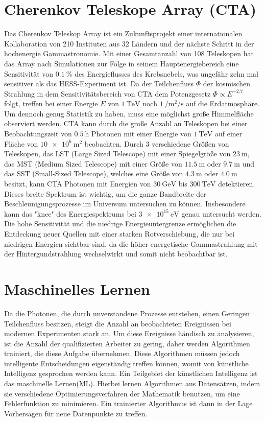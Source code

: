 \section{Cherenkov Teleskope Array (CTA)}

Das Cherenkov Teleskop Array ist ein Zukunftsprojekt einer internationalen Kollaboration von 210 Instituten aus 32 Ländern\cite{CTA_consortium}
und der nächste Schritt in der hochenergie Gammastronomie.
Mit einer Gesamtanzahl von 108 Teleskopen hat das Array nach Simulationen zur Folge in seinem Hauptenergiebereich eine Sensitivität von $\SI{0.1}{\percent}$
des Energieflusses des Krebsnebels, was ungefähr zehn mal sensitiver als das HESS-Experiment ist\cite{CTA_paper}.
Da der Teilchenfluss $\Phi$ der kosmischen Strahlung in dem Sensitivitätsbereich von CTA dem Potenzgesetz $\Phi \propto E^{-2.7}$\cite[5]{Cosmic_rays} folgt,
treffen bei einer Energie $E$ von $\SI{1}{\tera\eV}$ noch $\SI{1}{\per\m\squared\per\s}$ auf die Erdatmosphäre.
Um dennoch genug Statistik zu haben, muss eine möglichst große Himmelfläche observiert werden.
CTA kann durch die große Anzahl an Teleskopen bei einer Beobachtungszeit von $\SI{0.5}{\hour}$ Photonen mit einer Energie von $\SI{1}{\tera\eV}$ auf einer
Fläche von $\SI{10e6}{\m\squared}$\cite{CTA_ob} beobachten.
Durch 3 verschiedene Größen von Teleskopen, das LST (Large Sized Telescope) mit einer Spiegelgröße von $\SI{23}{\m}$, das MST (Medium Sized Telescope)
mit einer Größe von $\SI{11.5}{\m}$ oder $\SI{9.7}{\m}$ und das SST (Small-Sized Telescope), welches eine Größe von $\SI{4.3}{\m}$ oder $\SI{4.0}{\m}$
besitzt, kann CTA Photonen mit Energien von $\SI{30}{\giga\eV}$ bis $\SI{300}{\tera\eV}$ detektieren.
Dieses breite Spektrum ist wichtig, um die ganze Bandbreite der Beschleunigungsprozesse im Universum untersuchen zu können.
Insbesondere kann das "knee" des Energiespektrums bei $\SI{3e15}{\eV}$ genau untersucht werden.
Die hohe Sensitivität und die niedrige Energieuntergrenze ermöglichen die Entdeckung neuer Quellen mit einer starken Rotverschiebung, die nur bei niedrigen
Energien sichtbar sind, da die höher energetische Gammastrahlung mit der Hintergundstrahlung wechselwirkt und somit nicht beobachtbar ist.

\section{Maschinelles Lernen}

Da die Photonen, die durch unverstandene Prozesse entstehen, einen Geringen Teilchenfluss besitzen, steigt die Anzahl an beobachteten Ereignissen bei modernen
Experimenten stark an.
Um diese Ereignisse händisch zu analysieren, ist die Anzahl der qualifizierten Arbeiter zu gering, daher werden Algorithmen trainiert,
die diese Aufgabe übernehmen. Diese Algorithmen müssen jedoch intelligente Entscheidungen eigenständig treffen können, womit von künstliche Intelligenz
gesprochen werden kann.
Ein Teilgebiet der künstlichen Intelligenz ist das maschinelle Lernen(ML). Hierbei lernen Algorithmen aus Datensätzen, indem sie verschiedene Optimierungsverfahren
der Mathematik benutzen, um eine Fehlerfunktion zu minimieren. Ein trainierter Algorithmus ist dann in der Lage Vorhersagen für neue Datenpunkte zu treffen.

